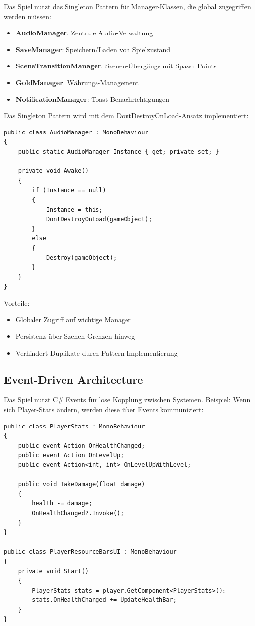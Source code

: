 \documentclass[
  a4paper,
  11pt,
  ngerman,
  parskip=half,
  bibliography=totoc,
  listof=totoc
]{scrreprt}
\begin{document}
Das Spiel nutzt das Singleton Pattern für Manager-Klassen, die global zugegriffen werden müssen:

\begin{itemize}
    \item \textbf{AudioManager}: Zentrale Audio-Verwaltung
    \item \textbf{SaveManager}: Speichern/Laden von Spielzustand
    \item \textbf{SceneTransitionManager}: Szenen-Übergänge mit Spawn Points
    \item \textbf{GoldManager}: Währungs-Management
    \item \textbf{NotificationManager}: Toast-Benachrichtigungen
\end{itemize}

Das Singleton Pattern wird mit dem DontDestroyOnLoad-Ansatz implementiert:

\begin{lstlisting}[caption={Singleton Pattern Implementierung}, label=lst:singleton]
public class AudioManager : MonoBehaviour
{
    public static AudioManager Instance { get; private set; }

    private void Awake()
    {
        if (Instance == null)
        {
            Instance = this;
            DontDestroyOnLoad(gameObject);
        }
        else
        {
            Destroy(gameObject);
        }
    }
}
\end{lstlisting}

Vorteile:
\begin{itemize}
    \item Globaler Zugriff auf wichtige Manager
    \item Persistenz über Szenen-Grenzen hinweg
    \item Verhindert Duplikate durch Pattern-Implementierung
\end{itemize}

\subsection{Event-Driven Architecture}

Das Spiel nutzt C\# Events für lose Kopplung zwischen Systemen. Beispiel: Wenn sich Player-Stats ändern, werden diese über Events kommuniziert:

\begin{lstlisting}[caption={Event-Driven Architecture Beispiel}, label=lst:event_driven]
public class PlayerStats : MonoBehaviour
{
    public event Action OnHealthChanged;
    public event Action OnLevelUp;
    public event Action<int, int> OnLevelUpWithLevel;

    public void TakeDamage(float damage)
    {
        health -= damage;
        OnHealthChanged?.Invoke();
    }
}

public class PlayerResourceBarsUI : MonoBehaviour
{
    private void Start()
    {
        PlayerStats stats = player.GetComponent<PlayerStats>();
        stats.OnHealthChanged += UpdateHealthBar;
    }
}
\end{lstlisting}
\end{document}
